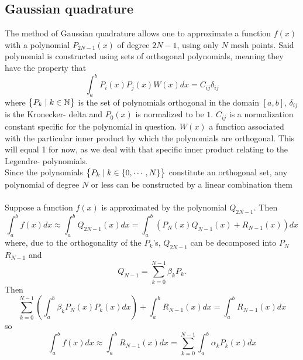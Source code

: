 \documentclass[10pt,a4paper]{article}
\begin{document}
\subsection{Gaussian quadrature}\label{Gaussian quadrature}
The method of Gaussian quadrature allows one to approximate a function $f(x)$ with a polynomial $P_{2N-1}(x)$ of degree $2N-1$, using only $N$ mesh points. Said polynomial is constructed using sets of orthogonal polynomials, meaning they have the property that
\begin{equation}
\int_a^b P_i(x)P_j(x)W(x)dx = C_{ij}\delta_{ij}
\end{equation}
where $\big\{ P_k\hspace{1mm}|\hspace{1mm} k \in \mathbb N \big\}$ is the set of polynomials orthogonal in the domain $[a,b]$, $\delta_{ij}$ is the Kronecker- delta and $P_0(x)$ is normalized to be $1$. $C_{ij}$ is a normalization constant specific for the polynomial in question. $W(x)$ a function associated with the particular inner product by which the polynomials are orthogonal. This will equal 1 for now, as we deal with that specific inner product relating to the Legendre- polynomials.\\Since the polynomials $\big\{ P_k\hspace{1mm}|\hspace{1mm} k \in \{0,\cdots ,N\} \big\}$ constitute an orthogonal set, any polynomial of degree $N$ or less can be constructed by a linear combination them\\\\Suppose a function $f(x)$ is approximated by the polynomial $Q_{2N-1}$. Then
\begin{equation}\label{Eq:Poly approximation}
\int_{a}^bf(x)dx \approx \int_{a}^bQ_{2N-1}(x)dx=\int_{a}^b\left(P_N(x)Q_{N-1}(x)+R_{N-1}(x)\right)dx
\end{equation}
where, due to the orthogonality of the $P_k$'s, $Q_{2N-1}$ can be decomposed into $P_N$ $R_{N-1}$ and 
\begin{equation}\label{Eq:orthogonal polynomial expansion}
Q_{N-1} = \sum\limits_{k=0}^{N-1} \beta_k P_k.
\end{equation}
Then
$$
\sum\limits_{k=0}^{N-1} \left( \int_{a}^b \beta_k P_N(x) P_k(x)dx \right)+\int_{a}^bR_{N-1}(x)dx = \int_{a}^bR_{N-1}(x)dx
$$
so
\begin{equation*}
\int_{a}^bf(x)dx \approx \int_{a}^bR_{N-1}(x)dx = \sum\limits_{k=0}^{N-1}  \int_{a}^b \alpha_k P_k(x)dx
\end{equation*}
\end{document}
